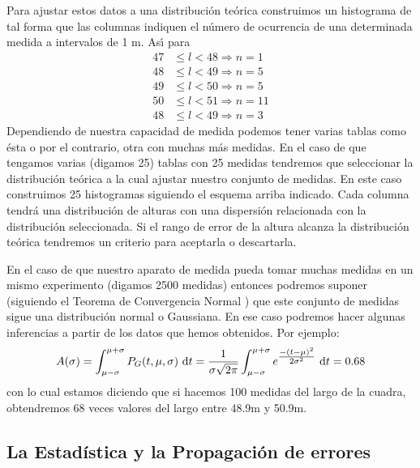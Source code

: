 \documentclass[spanish,titlepage,11pt]{article}
\begin{document}
Para ajustar estos datos a una distribuci\'{o}n te\'{o}rica construimos un
histograma de tal forma que las columnas indiquen el n\'{u}mero de ocurrencia
de una determinada medida a intervalos de 1 m. As\'{\i} para
\begin{align*}
47  &  \leq\mathit{l}<48\Rightarrow n=1\\
48  &  \leq\mathit{l}<49\Rightarrow n=5\\
49  &  \leq\mathit{l}<50\Rightarrow n=5\\
50  &  \leq\mathit{l}<51\Rightarrow n=11\\
48  &  \leq\mathit{l}<49\Rightarrow n=3
\end{align*}
Dependiendo de nuestra capacidad de medida podemos tener varias tablas como
\'{e}sta o por el contrario, otra con muchas m\'{a}s medidas. En el caso de
que tengamos varias (digamos 25) tablas con 25 medidas tendremos que
seleccionar la distribuci\'{o}n te\'{o}rica a la cual ajustar nuestro conjunto
de medidas. En este caso construimos 25 histogramas siguiendo el esquema
arriba indicado. Cada columna tendr\'{a} una distribuci\'{o}n de alturas con
una dispersi\'{o}n relacionada con la distribuci\'{o}n seleccionada. Si el
rango de error de la altura alcanza la distribuci\'{o}n te\'{o}rica tendremos
un criterio para aceptarla o descartarla.

En el caso de que nuestro aparato de medida pueda tomar muchas medidas en un
mismo experimento (digamos 2500 medidas) entonces podremos suponer (siguiendo
el Teorema de Convergencia Normal ) que este conjunto de medidas sigue una
distribuci\'{o}n normal o Gaussiana. En ese caso podremos hacer algunas
inferencias a partir de los datos que hemos obtenidos. Por ejemplo:
\[
A(\sigma)=\int_{\mu-\sigma}^{\mu+\sigma}P_{G}(t,\mu,\sigma)\ \mathrm{d}%
t=\frac{1}{\sigma\sqrt{2\pi}}\int_{\mu-\sigma}^{\mu+\sigma}{\Large e}%
^{\tfrac{-\left(  t-\mu\right)  ^{2}}{2\sigma^{2}}}\ \mathrm{d}t=0.68
\]
con lo cual estamos diciendo que si hacemos 100 medidas del largo de la
cuadra, obtendremos 68 veces valores del largo entre 48.9m y 50.9m.

\subsection{La Estad\'{i}stica y la Propagaci\'{o}n de errores}
\end{document}
